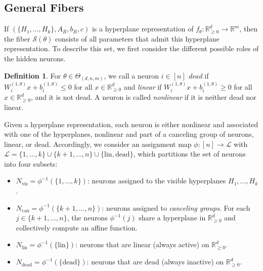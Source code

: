 \documentclass{article}
\theoremstyle{definition}
\newtheorem{definition}[theorem]{Definition}
\newcommand{\R}{\mathbb{R}}
\newcommand{\paramspace}[1]{\Theta_{#1}}
\newcommand{\weights}[1]{W^{(#1)}}
\newcommand{\bias}[1]{b^{(#1)}}
\newcommand{\fiber}[1]{\mathcal{S}({#1})}
\newcommand{\orthant}[1]{\R_{\geq 0}^{#1}}
\begin{document}
\subsection{General Fibers} 
\label{app:general-fiber}

 If $(\{H_1,\ldots,H_k\}, A_R, b_R, c)$ is a hyperplane representation of $f_\theta \colon \orthant{d} \to \R^m$, 
 then the fiber $\fiber{\theta}$ consists of all parameters that admit this hyperplane representation. 
To describe this set, we first consider the different possible roles of the hidden neurons. 

\begin{definition}
For $\theta \in \paramspace{(d,n,m)}$, we call a neuron $i\in[n]$ \emph{dead} if
$\weights{1,\theta}_i x + \bias{1,\theta}_i \le 0$ for all $x\in\R_{\ge0}^d$ and  \emph{linear} if
$\weights{1,\theta}_i x + \bias{1,\theta}_i \ge 0$ for all $x\in\R_{\ge0}^d$, 
and it is not dead. A neuron is called
\emph{nonlinear} if it is neither dead nor linear. 
\end{definition} 

Given a hyperplane representation, 
each neuron is either nonlinear and associated with one of the hyperplanes, 
nonlinear and part of a canceling group of neurons, linear, or dead. 
%
Accordingly, we consider an assignment map $\phi \colon [n] \to \mathcal{L}$ with 
$\mathcal{L} = \{1, \dots, k\} \cup \{k+1, \dots, n\} \cup \{\text{lin}, \text{dead}\}$,  
which partitions the set of neurons into four subsets: 
% 
\begin{itemize}[leftmargin=*]
    \item $N_{\text{vis}} = \phi^{-1}(\{1, \dots, k\})$: 
    neurons assigned to the visible hyperplanes $H_1,\ldots, H_k$.  
    \item $N_{\text{can}} = \phi^{-1}(\{k+1, \dots, n\})$: neurons assigned to \emph{canceling groups}. 
    For each $j\in\{k+1,\ldots, n\}$, 
    the neurons $\phi^{-1}(j)$ share a hyperplane in $\mathbb{R}_{\geq0}^d$ and collectively compute an affine function. 
    \item $N_{\text{lin}} = \phi^{-1}(\{\text{lin}\})$: neurons that are linear (always active) on $\orthant{d}$. 
    \item $N_{\text{dead}} = \phi^{-1}(\{\text{dead}\})$: neurons that are dead (always inactive) on $\orthant{d}$. 
\end{itemize}
\end{document}
